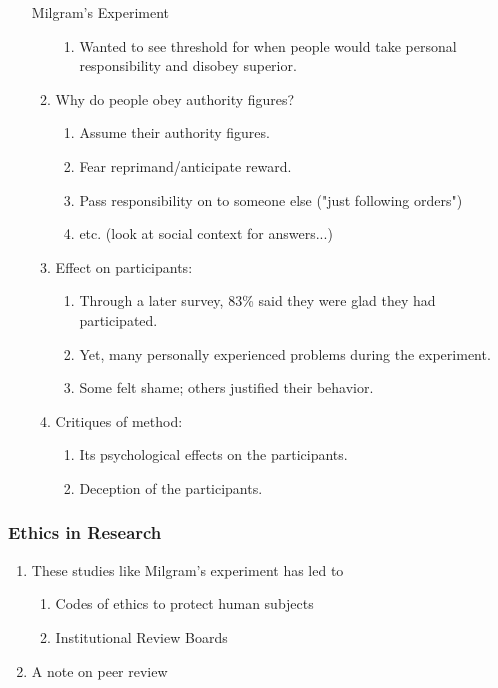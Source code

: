 \documentclass[12pt,a4paper]{article}
\begin{document}
\begin{enumerate}
\begin{eg}{Milgram's Experiment}
\begin{enumerate}
\begin{enumerate}
				\item Wanted to see threshold for when people would take personal responsibility and disobey superior. 
			\end{enumerate}
			\item Why do people obey authority figures? 
			\begin{enumerate}
				\item Assume their authority figures. 
				\item Fear reprimand/anticipate reward.
				\item Pass responsibility on to someone else ("just following orders")
				\item etc. (look at social context for answers...)
			\end{enumerate}
			\item Effect on participants: 
			\begin{enumerate}
				\item Through a later survey, 83\% said they were glad they had participated. 
				\item Yet, many personally experienced problems during the experiment. 
				\item Some felt shame; others justified their behavior. 
			\end{enumerate}
			\item Critiques of method: 
			\begin{enumerate}
				\item Its psychological effects on the participants. 
				\item Deception of the participants. 
			\end{enumerate}
		\end{enumerate}
	\end{eg}
\end{enumerate}

\subsubsection{Ethics in Research}
\begin{enumerate}
	\item These studies like Milgram's experiment has led to 
	\begin{enumerate}
		\item Codes of ethics to protect human subjects
		\item Institutional Review Boards
	\end{enumerate}
	\item A note on peer review
\end{enumerate}
\end{document}
